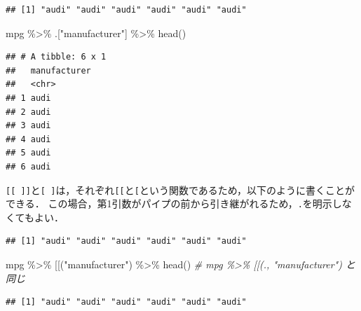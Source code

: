 \documentclass[
]{article}
\newenvironment{Shaded}{\begin{snugshade}}{\end{snugshade}}
\newcommand{\AttributeTok}[1]{\textcolor[rgb]{0.77,0.63,0.00}{#1}}
\newcommand{\CommentTok}[1]{\textcolor[rgb]{0.56,0.35,0.01}{\textit{#1}}}
\newcommand{\FunctionTok}[1]{\textcolor[rgb]{0.00,0.00,0.00}{#1}}
\newcommand{\NormalTok}[1]{#1}
\newcommand{\SpecialCharTok}[1]{\textcolor[rgb]{0.00,0.00,0.00}{#1}}
\newcommand{\StringTok}[1]{\textcolor[rgb]{0.31,0.60,0.02}{#1}}
\begin{document}
\begin{verbatim}
## [1] "audi" "audi" "audi" "audi" "audi" "audi"
\end{verbatim}

\begin{Shaded}
\begin{Highlighting}[]
\NormalTok{mpg }\SpecialCharTok{\%\textgreater{}\%}\NormalTok{ .[}\StringTok{"manufacturer"}\NormalTok{]   }\SpecialCharTok{\%\textgreater{}\%} \FunctionTok{head}\NormalTok{()}
\end{Highlighting}
\end{Shaded}

\begin{verbatim}
## # A tibble: 6 x 1
##   manufacturer
##   <chr>       
## 1 audi        
## 2 audi        
## 3 audi        
## 4 audi        
## 5 audi        
## 6 audi
\end{verbatim}

\texttt{{[}{[}\ {]}{]}}と\texttt{{[}\ {]}}は，それぞれ\texttt{{[}{[}}と\texttt{{[}}という関数であるため，以下のように書くことができる．
この場合，第1引数がパイプの前から引き継がれるため，\texttt{.}を明示しなくてもよい．

\begin{Shaded}
\end{Shaded}

\begin{verbatim}
## [1] "audi" "audi" "audi" "audi" "audi" "audi"
\end{verbatim}

\begin{Shaded}
\begin{Highlighting}[]
\NormalTok{mpg }\SpecialCharTok{\%\textgreater{}\%} \StringTok{\textasciigrave{}}\AttributeTok{[[}\StringTok{\textasciigrave{}}\NormalTok{(}\StringTok{"manufacturer"}\NormalTok{) }\SpecialCharTok{\%\textgreater{}\%} \FunctionTok{head}\NormalTok{() }\CommentTok{\# mpg \%\textgreater{}\% \textasciigrave{}[[\textasciigrave{}(., "manufacturer") と同じ}
\end{Highlighting}
\end{Shaded}

\begin{verbatim}
## [1] "audi" "audi" "audi" "audi" "audi" "audi"
\end{verbatim}
\end{document}
